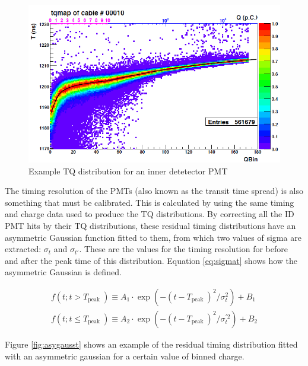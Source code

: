 \begin{figure}
    \includegraphics[width=\textwidth]{Figures/TQdist.png}
\caption{Example TQ distribution for an inner detetector PMT}
    \label{fig:TQdist}
\end{figure}


The timing resolution of the PMTs (also known as the transit time spread) is also something that must be calibrated. This is calculated by using the same timing and charge data used to produce the TQ distributions. By correcting all the ID PMT hits by their TQ distributions, these residual timing distributions have an asymmetric Gaussian function fitted to them, from which two values of sigma are extracted: $\sigma_{t}$ and $\sigma_{t'}$. These are the values for the timing resolution for before and after the peak time of this distribution. Equation \ref{eq:sigmat} shows how the asymmetric Gaussian is defined. 

\begin{align}
    f\left(t ; t>T_{\text {peak }}\right) \equiv A_{1} \cdot \exp \left(-\left(t-T_{\text {peak }}\right)^{2} / \sigma_{t}^{2}\right)+B_{1}\\
    f\left(t ; t \leq T_{\text {peak }}\right) \equiv A_{2} \cdot \exp \left(-\left(t-T_{\text {peak }}\right)^{2} / \sigma_{t}^{\prime 2}\right)+B_{2}
\label{eq:sigmat}
\end{align}

Figure \ref{fig:asygausst} shows an example of the residual timing distribution fitted with an asymmetric gaussian for a certain value of binned charge.

